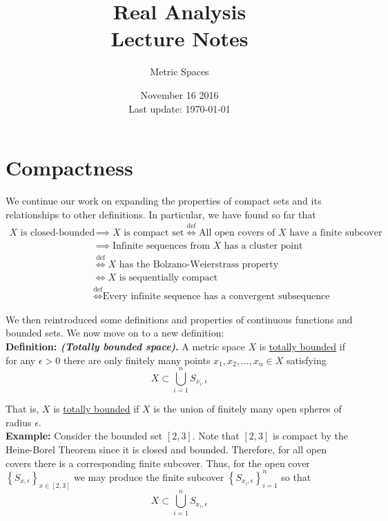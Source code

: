 \documentclass[12pt]{article}
\newlength\tindent
\renewcommand{\indent}{\hspace*{\tindent}}
\begin{document}
 
 
\title{Real Analysis\\Lecture Notes}
\author{Metric Spaces}
\date{November 16 2016 \\ Last update: \today{}}
\maketitle

\section{Compactness}

\indent We continue our work on expanding the properties of compact sets and its relationships to other definitions. In particular, we have found so far that
\begin{align*}
	\text{$X$ is closed-bounded} &\implies \text{$X$ is compact set} \stackrel{\text{def}}{\iff} \text{All open covers of $X$ have a finite subcover}\\
	&\implies \text{Infinite sequences from $X$ has a cluster point} \\
	&\stackrel{\text{def}}{\iff} \text{$X$ has the Bolzano-Weierstrass property} \\
	&\iff \text{$X$ is sequentially compact} \\
	&\stackrel{\text{def}}{\iff} \text{Every infinite sequence has a convergent subsequence}
\end{align*}

\indent We then reintroduced some definitions and properties of continuous functions and bounded sets. We now move on to a new definition: \\

%
%
{\bf Definition: {\em (Totally bounded space)}.} A metric space $X$ is \underline{totally bounded} if for any $\epsilon > 0$ there are only finitely many points $x_1, x_2, ..., x_n \in X$ satisfying
\begin{equation*}
	X \subset \bigcup^n_{i = 1} S_{x_i,\epsilon} 
\end{equation*}

That is, $X$ is \underline{totally bounded} if $X$ is the union of finitely many open spheres of radius $\epsilon$. \\

%
%
{\bf Example:} Consider the bounded set $[2,3]$. Note that $[2,3]$ is compact by the Heine-Borel Theorem since it is closed and bounded. Therefore, for all open covers there is a corresponding finite subcover. Thus, for the open cover $\left\{S_{x,\epsilon}\right\}_{x\in [2,3]}$ we may produce the finite subcover $\left\{S_{{x_i},\epsilon}\right\}^n_{i = 1}$ so that
\begin{equation*}
	X \subset \bigcup^n_{i = 1} S_{{x_i},\epsilon}
\end{equation*}
\end{document}
